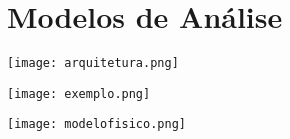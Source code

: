 \chapter{Modelos de Análise}



\begin{center}
    \pagebreak

    \texttt{[image: arquitetura.png]}
    
    \texttt{[image: exemplo.png]}

    \texttt{[image: modelofisico.png]}
\end{center}

